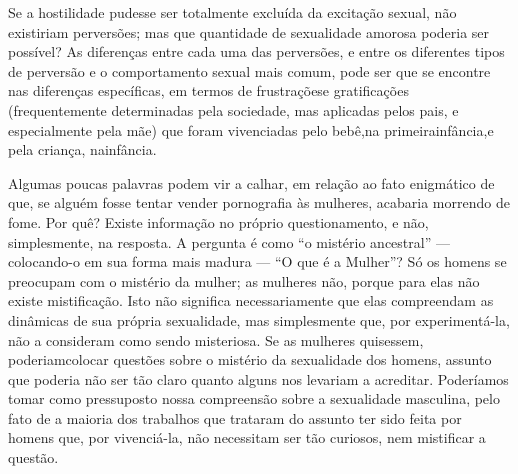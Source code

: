 Se a hostilidade pudesse ser totalmente excluída da excitação
sexual, não existiriam perversões; mas que quantidade de sexualidade
amorosa poderia ser possível? As diferenças entre cada uma das
perversões, e entre os diferentes tipos de perversão e o comportamento
sexual mais comum, pode ser que se encontre nas diferenças específicas,
em termos de frustrações\idxinfanfrust[|)] e gratificações (frequentemente determinadas
pela sociedade, mas aplicadas pelos pais, e especialmente pela mãe) que
foram vivenciadas pelo bebê,\idxhostexci[|)] na primeira\idxsexuehos[|)] infância,\idxpornohost[|)] e pela criança, na\idxhostporn[|)]
infância.

Algumas poucas palavras podem vir a calhar, em relação ao fato
enigmático de que, se alguém fosse tentar vender pornografia às
mulheres, acabaria morrendo de fome. Por quê? Existe informação no
próprio questionamento, e não, simplesmente, na resposta. A pergunta é
como ``o mistério ancestral'' ---
colocando-o em sua forma mais madura --- ``O que é a
Mulher''? Só os homens se preocupam com o mistério da
mulher; as mulheres não, porque para elas não existe mistificação. Isto
não significa necessariamente que elas compreendam as dinâmicas de sua
própria sexualidade, mas simplesmente que, por experimentá-la, não a
consideram como sendo misteriosa. Se as mulheres quisessem, poderiam\idxpornomulh[|(]
colocar questões sobre o mistério da sexualidade dos homens, assunto
que poderia não ser tão claro quanto alguns nos levariam a acreditar.
Poderíamos tomar como pressuposto nossa compreensão sobre a sexualidade
masculina, pelo fato de a maioria dos trabalhos que trataram do assunto
ter sido feita por homens que, por vivenciá-la, não necessitam ser tão
curiosos, nem mistificar a questão.

